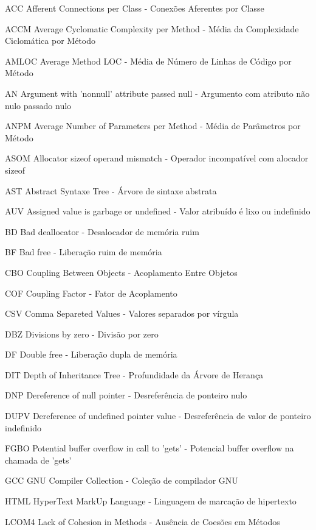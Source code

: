 \begin{siglas}
  \item[ACC] Afferent Connections per Class - Conexões Aferentes por Classe 
  \item[ACCM] Average Cyclomatic Complexity per Method - Média da Complexidade Ciclomática por Método
  \item[AMLOC] Average Method LOC - Média de Número de Linhas de Código por Método
  \item[AN] Argument with 'nonnull' attribute passed null - Argumento com atributo não nulo passado nulo
  \item[ANPM] Average Number of Parameters per Method - Média de Parâmetros por Método
  \item[ASOM] Allocator sizeof operand mismatch - Operador incompatível com alocador sizeof
  \item[AST] Abstract Syntaxe Tree - Árvore de sintaxe abstrata
  \item[AUV] Assigned value is garbage or undefined - Valor atribuído é lixo ou indefinido
  \item[BD] Bad deallocator - Desalocador de memória ruim
  \item[BF] Bad free - Liberação ruim de memória
  \item[CBO] Coupling Between Objects - Acoplamento Entre Objetos 
  \item[COF] Coupling Factor - Fator de Acoplamento
  \item[CSV] Comma Separeted Values - Valores separados por vírgula
  \item[DBZ] Divisions by zero - Divisão por zero
  \item[DF] Double free - Liberação dupla de memória
  \item[DIT] Depth of Inheritance Tree - Profundidade da Árvore de Herança 
  \item[DNP] Dereference of null pointer - Desreferência de ponteiro nulo
  \item[DUPV] Dereference of undefined pointer value - Desreferência de valor de ponteiro indefinido
  \item[FGBO] Potential buffer overflow in call to 'gets' - Potencial buffer overflow na chamada de 'gets'
  \item[GCC] GNU Compiler Collection - Coleção de compilador GNU
  \item[HTML] HyperText MarkUp Language - Linguagem de marcação de hipertexto
  \item[LCOM4] Lack of Cohesion in Methods - Ausência de Coesões em Métodos

\end{siglas}
